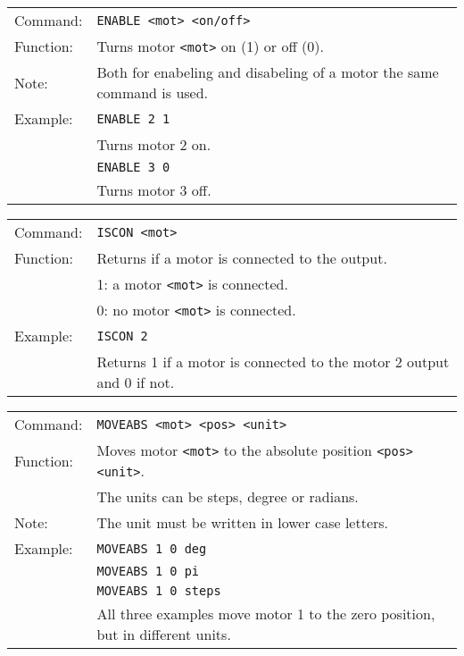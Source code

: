 \vspace{\vdistace}

\begin{table}[!htbp]
  \begin{tabularx}{\textwidth}{lX}
    Command:  & \texttt{ENABLE <mot> <on/off>}\\
    Function: & Turns motor \texttt{<mot>} on (1) or off (0).\\
    Note:     & Both for enabeling and disabeling of a motor the same command is used.\\
    Example:  & \texttt{ENABLE 2 1} \\
              & Turns motor 2 on. \\
              & \texttt{ENABLE 3 0} \\
              & Turns motor 3 off.
  \end{tabularx}
\end{table}

\vspace{\vdistace}

\begin{table}[!htbp]
  \begin{tabularx}{\textwidth}{lX}
    Command:  & \texttt{ISCON <mot>}\\
    Function: & Returns if a motor is connected to the output.\\
              & 1: a motor \texttt{<mot>} is connected.\\
		      & 0: no motor \texttt{<mot>} is connected.\\
    Example:  & \texttt{ISCON 2}\\
              & Returns 1 if a motor is connected to the motor 2 output and 0 if not.
  \end{tabularx}
\end{table}

\vspace{\vdistace}

\begin{table}[!htbp]
  \begin{tabularx}{\textwidth}{lX}
    Command:  & \texttt{MOVEABS <mot> <pos> <unit>}\\
    Function: & Moves motor \texttt{<mot>} to the absolute position \texttt{<pos> <unit>}.\\
              & The units can be steps, degree or radians.\\
    Note:     & The unit must be written in lower case letters.\\
    Example:  & \texttt{MOVEABS 1 0 deg} \\
              & \texttt{MOVEABS 1 0 pi} \\
              & \texttt{MOVEABS 1 0 steps} \\
              & All three examples move motor 1 to the zero position, but in different units.
  \end{tabularx}
\end{table}

